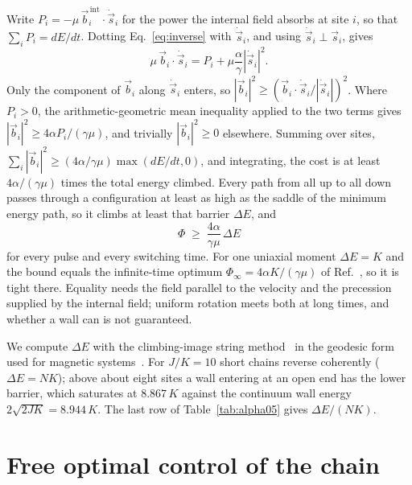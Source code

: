 \documentclass[11pt]{article}
\begin{document}
Write $P_i = -\mu\,\vec b^{\,\mathrm{int}}_i\cdot\dot{\vec s}_i$ for the power the internal field
absorbs at site $i$, so that $\sum_i P_i = dE/dt$. Dotting Eq.~\eqref{eq:inverse} with
$\dot{\vec s}_i$, and using $\dot{\vec s}_i \perp \vec s_i$, gives
\begin{equation}
\mu\,\vec b_i\cdot\dot{\vec s}_i = P_i + \mu\frac{\alpha}{\gamma}|\dot{\vec s}_i|^2 .
\end{equation}
Only the component of $\vec b_i$ along $\dot{\vec s}_i$ enters, so $|\vec b_i|^2 \ge (\vec b_i\cdot
\dot{\vec s}_i/|\dot{\vec s}_i|)^2$. Where $P_i>0$, the arithmetic-geometric mean inequality applied to
the two terms gives $|\vec b_i|^2 \ge 4\alpha P_i/(\gamma\mu)$, and trivially $|\vec b_i|^2 \ge 0$
elsewhere. Summing over sites, $\sum_i |\vec b_i|^2 \ge (4\alpha/\gamma\mu)\max(dE/dt,0)$, and
integrating, the cost is at least $4\alpha/(\gamma\mu)$ times the total energy climbed. Every path from
all up to all down passes through a configuration at least as high as the saddle of the minimum energy
path, so it climbs at least that barrier $\Delta E$, and
\begin{equation}
\Phi \;\ge\; \frac{4\alpha}{\gamma\mu}\,\Delta E
\label{eq:floor}
\end{equation}
for every pulse and every switching time. For one uniaxial moment $\Delta E = K$ and the bound equals
the infinite-time optimum $\Phi_\infty = 4\alpha K/(\gamma\mu)$ of Ref.~\citep{kwiatkowski2021}, so it is
tight there. Equality needs the field parallel to the velocity and the precession supplied by the
internal field; uniform rotation meets both at long times, and whether a wall can is not guaranteed.

We compute $\Delta E$ with the climbing-image string method~\citep{e2007} in the geodesic form used for
magnetic systems~\citep{bessarab2015}. For $J/K = 10$ short chains reverse coherently
($\Delta E = NK$); above about eight sites a wall entering at an open end has the lower barrier, which
saturates at $8.867\,K$ against the continuum wall energy $2\sqrt{2JK} = 8.944\,K$. The last row of
Table~\ref{tab:alpha05} gives $\Delta E/(NK)$.

\section{Free optimal control of the chain}
\end{document}
